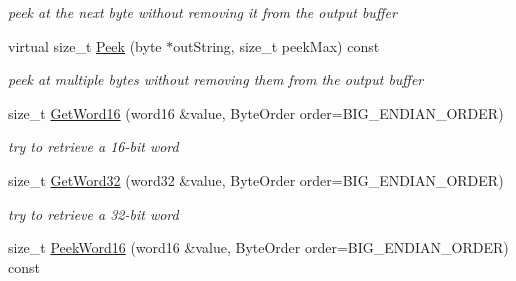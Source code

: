 \begin{DoxyCompactItemize}
\begin{DoxyCompactList}\small\item\em peek at the next byte without removing it from the output buffer \item\end{DoxyCompactList}\item 
\hypertarget{class_buffered_transformation_a40e2587068cd01740502fcfcb640bc93}{
virtual size\_\-t \hyperlink{class_buffered_transformation_a40e2587068cd01740502fcfcb640bc93}{Peek} (byte $\ast$outString, size\_\-t peekMax) const }
\label{class_buffered_transformation_a40e2587068cd01740502fcfcb640bc93}

\begin{DoxyCompactList}\small\item\em peek at multiple bytes without removing them from the output buffer \item\end{DoxyCompactList}\item 
\hypertarget{class_buffered_transformation_a1ac50bcb2d279c3c6aef6858dab3eeb7}{
size\_\-t \hyperlink{class_buffered_transformation_a1ac50bcb2d279c3c6aef6858dab3eeb7}{GetWord16} (word16 \&value, ByteOrder order=BIG\_\-ENDIAN\_\-ORDER)}
\label{class_buffered_transformation_a1ac50bcb2d279c3c6aef6858dab3eeb7}

\begin{DoxyCompactList}\small\item\em try to retrieve a 16-\/bit word \item\end{DoxyCompactList}\item 
\hypertarget{class_buffered_transformation_a69c064d931db3a8631c1138827d67e2f}{
size\_\-t \hyperlink{class_buffered_transformation_a69c064d931db3a8631c1138827d67e2f}{GetWord32} (word32 \&value, ByteOrder order=BIG\_\-ENDIAN\_\-ORDER)}
\label{class_buffered_transformation_a69c064d931db3a8631c1138827d67e2f}

\begin{DoxyCompactList}\small\item\em try to retrieve a 32-\/bit word \item\end{DoxyCompactList}\item 
\hypertarget{class_buffered_transformation_a452057f0d887ba0f2b6ec5373e290e91}{
size\_\-t \hyperlink{class_buffered_transformation_a452057f0d887ba0f2b6ec5373e290e91}{PeekWord16} (word16 \&value, ByteOrder order=BIG\_\-ENDIAN\_\-ORDER) const }
\label{class_buffered_transformation_a452057f0d887ba0f2b6ec5373e290e91}


\end{DoxyCompactItemize}
